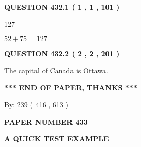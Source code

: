 \documentclass[12pt]{article}
\begin{document}
{\textbf{\Large{QUESTION
432.1 
 ( 1 , 1 , 101 )
}}}
  
  
 
 
\noindent{}

127
 
 
 
 
\noindent{}

$ %
52 +  %
75=   %
127$
 
 
  
\vspace{0.2in}
  
{\textbf{\Large{QUESTION
432.2 
 ( 2 , 2 , 201 )
}}}
  
  
 
 
\noindent{}
 
 
The capital of Canada is Ottawa.
 
 
 
 
   
   
 \vspace{0.2in}
 
   
   
   
   
\vspace{1.0in} 
{\textbf{\large{ *** END OF PAPER, THANKS *** }}} 
   
   
\hspace{1.0in} By: 
 239 ( 416 ,  613 )
   
   
   
   
\newpage 
\setcounter{page}{ 
   433001 } 
   
   
   
   
 {\textbf{ \Large{ PAPER NUMBER  433  }}}
   
   
\vspace{0.2in}
   
   
   
   
   
   
 \vspace{0.2in}
{\LARGE {\textbf{ A QUICK TEST EXAMPLE}}}
   
   
   
\vspace{0.2in}
   
\end{document}
